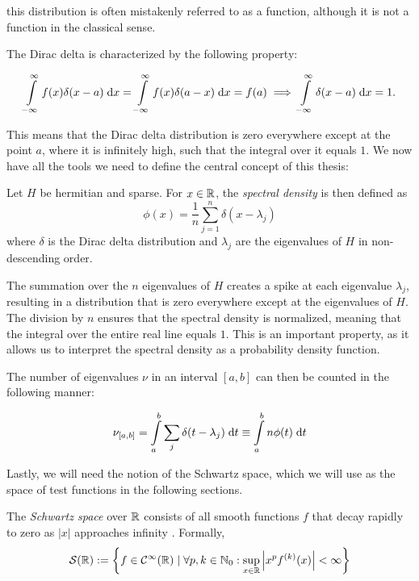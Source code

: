 this distribution is often mistakenly referred to as a function, although it is not a function in the classical sense.

The Dirac delta is characterized by the following property:

\[
\int\limits_{-\infty}^{\infty} f(x) \delta(x-a) \;\mathrm{d}x = \int\limits_{-\infty}^{\infty} f(x) \delta(a-x) \;\mathrm{d}x = f(a) \implies \int\limits_{-\infty}^{\infty} \delta(x-a) \;\mathrm{d}x = 1.
\]

This means that the Dirac delta distribution is zero everywhere except at the point $a$, where it is infinitely high, such that the integral over it equals $1$. We now have all the tools we need to define the central concept of this thesis:

\begin{definition}
    Let $H$ be hermitian and sparse.
    For $x \in \mathbb{R}$, the \emph{spectral density} is then defined as
    \[
    \phi(x) = \frac{1}{n} \sum_{j=1}^{n} \delta(x - \lambda_j)
    \]
    where $\delta$ is the Dirac delta distribution
    and $\lambda_j$ are the eigenvalues of $H$ in non-descending order.
\end{definition}

The summation over the $n$ eigenvalues of $H$ creates a spike at each eigenvalue $\lambda_j$, resulting in a distribution that is zero everywhere except at the eigenvalues of $H$. The division by $n$ ensures that the spectral density is normalized, meaning that the integral over the entire real line equals $1$. This is an important property, as it allows us to interpret the spectral density as a probability density function.

The number of eigenvalues $\nu$ in an interval $[a, b]$ can then be counted in the following manner:

\begin{equation} \label{eq:nu_a_b}
    \nu_{[a, b]} = \int\limits_a^b \sum_j \delta(t - \lambda_j) \;\mathrm{d}t \equiv \int\limits_a^b n \phi(t) \;\mathrm{d}t
\end{equation}

Lastly, we will need the notion of the Schwartz space, which we will use as the space of test functions in the following sections.

\begin{definition} \label{def:Schwartz space}
    The \emph{Schwartz space} over $\mathbb{R}$ consists of all smooth functions $f$ that decay rapidly to zero as $|x|$ approaches infinity \cite{richtmyer}.
    Formally,
    \[
    \mathcal{S}(\mathbb{R}) := \left\{f \in \mathcal{C}^{\infty}(\mathbb{R}) \mid \forall p, k \in \mathbb{N}_0: \sup_{x \in \mathbb{R}} \left| x^p f^{(k)}(x) \right| < \infty \right\}
    \]
\end{definition}
